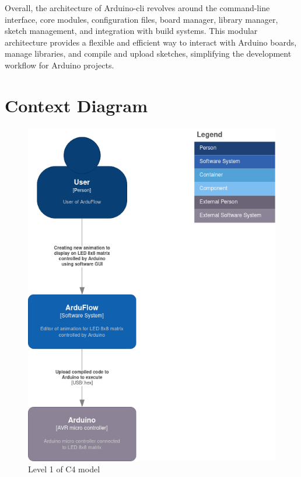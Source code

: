 \documentclass[a4paper, 11pt]{article}
\begin{document}
\bigbreak

Overall, the architecture of Arduino-cli revolves around the command-line interface, core modules, configuration files, board manager, library manager, sketch management, and integration with build systems. This modular architecture provides a flexible and efficient way to interact with Arduino boards, manage libraries, and compile and upload sketches, simplifying the development workflow for Arduino projects.

\section{Context Diagram}

\begin{figure}[H]
    \includegraphics[width=\linewidth]{C4model/ArduFlow c4-1.png}
    \caption{Level 1 of C4 model}
    \label{fig:Level 1 of C4 model}
\end{figure}
\end{document}
